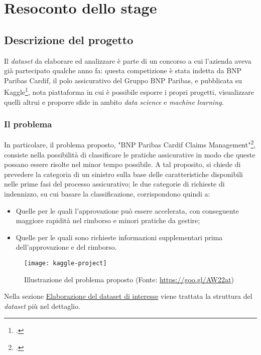 
\chapter{Resoconto dello stage}
\label{cap:resoconto-stage}

\section{Descrizione del progetto}
Il \textit{dataset} da elaborare ed analizzare è parte di un concorso a cui l'azienda aveva già partecipato qualche anno fa: questa competizione è stata indetta da BNP Paribas Cardif, il polo assicurativo del Gruppo BNP Paribas, e pubblicata su Kaggle\footcite{https://www.kaggle.com/}, nota piattaforma in cui è possibile esporre i propri progetti, visualizzare quelli altrui e proporre sfide in ambito \textit{data science} e \textit{machine learning}.

\subsection{Il problema}
In particolare, il problema proposto, "BNP Paribas Cardif Claims Management"\footcite{https://www.kaggle.com/c/bnp-paribas-cardif-claims-management}, consiste nella possibilità di classificare le pratiche assicurative in modo che queste possano essere risolte nel minor tempo possibile. A tal proposito, si chiede di prevedere la categoria di un sinistro sulla base delle caratteristiche disponibili nelle prime fasi del processo assicurativo; le due categorie di richieste di indennizzo, su cui basare la classificazione, corrispondono quindi a:
\begin{itemize}
	\item Quelle per le quali l'approvazione può essere accelerata, con conseguente maggiore rapidità nel rimborso e minori pratiche da gestire;
	\item Quelle per le quali sono richieste informazioni supplementari prima dell'approvazione e del rimborso.
\end{itemize}
\clearpage
\begin{figure}[!h] 
	\centering 
	\texttt{[image: kaggle-project]}
	\caption{Illustrazione del problema proposto (Fonte: \href{https://goo.gl/AW22at}{https://goo.gl/AW22at})}
\end{figure}
Nella sezione \hyperref[dataset]{Elaborazione del dataset di interesse} viene trattata la struttura del \textit{dataset} più nel dettaglio.

